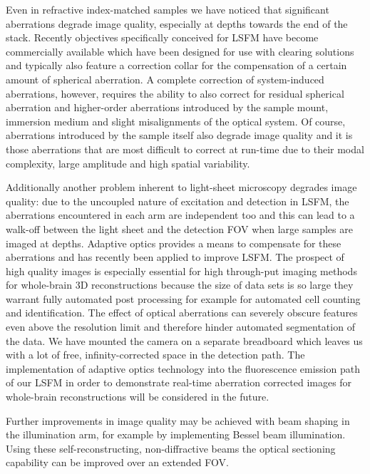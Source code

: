 \documentclass[12pt]{spieman}  %
\begin{document}
\begin{spacing}{2}
Even in refractive index-matched samples we have noticed that significant aberrations degrade image quality, especially at depths towards the end of the stack. Recently objectives specifically conceived for LSFM have become commercially available\cite{Marx2014} which have been designed for use with clearing solutions and typically also feature a correction collar for the compensation of a certain amount of spherical aberration. A complete correction of system-induced aberrations, however, requires the ability to also correct for residual spherical aberration and higher-order aberrations introduced by the sample mount, immersion medium and slight misalignments of the optical system. Of course, aberrations introduced by the sample itself also degrade image quality and it is those aberrations that are most difficult to correct at run-time due to their modal complexity, large amplitude and high spatial variability\cite{Wang2014}. 

Additionally another problem inherent to light-sheet microscopy degrades image quality: due to the uncoupled nature of excitation and detection in LSFM, the aberrations encountered in each arm are independent too and this can lead to a walk-off between the light sheet and the detection FOV when large samples are imaged at depths. Adaptive optics\cite{Booth2007} provides a means to compensate for these aberrations and has recently been applied to improve LSFM\cite{Jorand2012}. The prospect of high quality images is especially essential for high through-put imaging methods for whole-brain 3D reconstructions because the size of data sets is so large they warrant fully automated post processing for example for automated cell counting and identification\cite{Frasconi2014}. The effect of optical aberrations can severely obscure features even above the resolution limit and therefore hinder automated segmentation of the data. We have mounted the camera on a separate breadboard which leaves us with a lot of free, infinity-corrected space in the detection path. The implementation of adaptive optics technology into the fluorescence emission path of our LSFM in order to demonstrate real-time aberration corrected images for whole-brain reconstructions will be considered in the future. 

Further improvements in image quality may be achieved with beam shaping in the illumination arm, for example by implementing Bessel beam illumination\cite{Fahrbach2010,Planchon2011,Gao2014}. Using these self-reconstructing, non-diffractive beams the optical sectioning capability can be improved over an extended FOV. 


\end{spacing}
\end{document}
